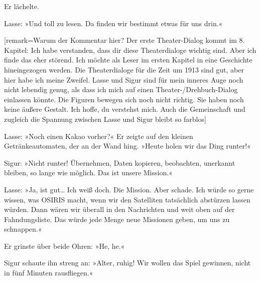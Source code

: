 Er lächelte.

Lasse: »Und toll zu lesen.
Da finden wir bestimmt etwas für uns drin.«

[remark={Warum der Kommentar hier? Der erste Theater-Dialog kommt im 8. Kapitel: Ich habe verstanden, dass dir diese Theaterdialoge wichtig sind. Aber ich finde das eher störend. Ich möchte als Leser im ersten Kapitel in eine Geschichte hineingezogen werden. Die Theaterdialoge für die Zeit um 1913 sind gut, aber hier habe ich meine Zweifel. Lasse und Sigur sind für mein inneres Auge noch nicht lebendig genug, als dass ich mich auf einen Theater-/Drehbuch-Dialog einlassen könnte.
Die Figuren bewegen sich noch nicht richtig. Sie haben noch keine äußere Gestalt. Ich hoffe, du verstehst mich. Auch die Gemeinschaft und zugleich die Spannung zwischen Lasse und Sigur bleibt so farblos}]

Lasse: »Noch einen Kakao vorher?« Er zeigte auf den kleinen Getränkeautomaten, der an der Wand hing. »Heute holen wir das Ding runter!«

Sigur: »Nicht runter! Übernehmen, Daten kopieren, beobachten, unerkannt bleiben, so lange wie möglich.
Das ist unsere Mission.«

Lasse: »Ja, ist gut… Ich weiß doch.
Die Mission.
Aber schade.
Ich würde so gerne wissen, was OSIRIS macht, wenn wir den Satelliten tatsächlich abstürzen lassen würden.
Dann wären wir überall in den Nachrichten und weit oben auf der Fahndungsliste.
Das würde jede Menge neue Missionen geben, um uns zu schnappen.«

Er grinste über beide Ohren: »He, he.«

Sigur schaute ihn streng an: »Alter, ruhig! Wir wollen das Spiel gewinnen, nicht in fünf Minuten rausfliegen.«

